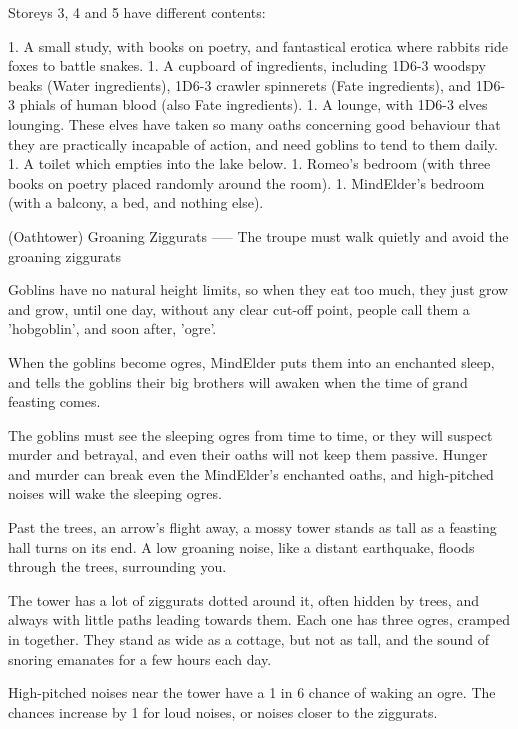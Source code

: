 Storeys 3, 4 and 5 have different contents:

\begin{dlist}
1. A small study, with books on poetry, and fantastical erotica where rabbits ride foxes to battle snakes.
1. A cupboard of \glspl{ingredient}, including 1D6-3 woodspy beaks (Water \glspl{ingredient}), 1D6-3 \gls{crawler} spinnerets (Fate \glspl{ingredient}), and 1D6-3 phials of human blood (also Fate \glspl{ingredient}).
1. A lounge, with 1D6-3 elves lounging.  These elves have taken so many oaths concerning good behaviour that they are practically incapable of action, and need goblins to tend to them daily.
1. A toilet which empties into the lake below.
1. Romeo's bedroom (with three books on poetry placed randomly around the room).
1. \gls{MindElder}'s bedroom (with a balcony, a bed, and nothing else).
\end{dlist}

(Oathtower) Groaning Ziggurats
-----
{The troupe must walk quietly and avoid the groaning ziggurats}

Goblins have no natural height limits, so when they eat too much, they just grow and grow, until one day, without any clear cut-off point, people call them a 'hobgoblin', and soon after, 'ogre'.

When the goblins become ogres, \gls{MindElder} puts them into an enchanted sleep, and tells the goblins their big brothers will awaken when the time of grand feasting comes.

The goblins must see the sleeping ogres from time to time, or they will suspect murder and betrayal, and even their oaths will not keep them passive.
Hunger and murder can break even the \gls{MindElder}'s enchanted oaths, and high-pitched noises will wake the sleeping ogres.

\begin{boxtext}
  Past the trees, an arrow's flight away, a mossy tower stands as tall as a feasting hall turns on its end.
  A low groaning noise, like a distant earthquake, floods through the trees, surrounding you.
\end{boxtext}

The tower has a lot of ziggurats dotted around it, often hidden by trees, and always with little paths leading towards them.
Each one has three ogres, cramped in together.
They stand as wide as a cottage, but not as tall, and the sound of snoring emanates for a few hours each day.

High-pitched noises near the tower
have a 1 in 6 chance of waking an ogre.
The chances increase by 1 for loud noises, or noises closer to the ziggurats.

